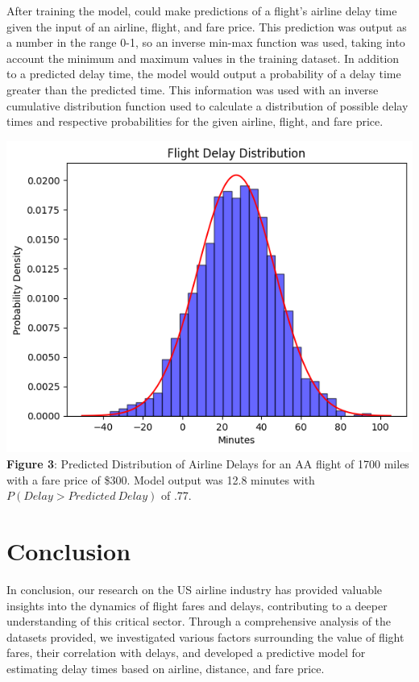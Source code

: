 \documentclass{article}
\begin{document}
    After training the model, could make predictions of a flight's airline delay time given the input of an airline, flight, and fare price. This prediction was output as a number in the range 0-1, so an inverse min-max function was used, taking into account the minimum and maximum values in the training dataset. In addition to a predicted delay time, the model would output a probability of a delay time greater than the predicted time. This information was used with an inverse cumulative distribution function used to calculate a distribution of possible delay times and respective probabilities for the given airline, flight, and fare price. 
    \begin{center}
    \includegraphics[scale=0.75]{images/output.png}
    \textbf{Figure 3}: Predicted Distribution of Airline Delays for an AA flight of 1700 miles with a fare price of \$300. Model output was 12.8 minutes with $P(Delay>Predicted \ Delay)$ of .77.
    \end{center}
    \section{Conclusion}
    In conclusion, our research on the US airline industry has provided valuable insights into the dynamics of flight fares and delays, contributing to a deeper understanding of this critical sector. Through a comprehensive analysis of the datasets provided, we investigated various factors surrounding the value of flight fares, their correlation with delays, and developed a predictive model for estimating delay times based on airline, distance, and fare price.
\end{document}
